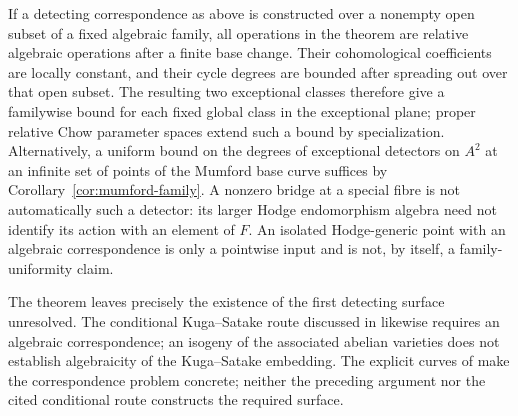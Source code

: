 If a detecting correspondence as above is constructed over a nonempty
open subset of a fixed algebraic family, all operations in the theorem
are relative algebraic operations after a finite base change.  Their
cohomological coefficients are locally constant, and their cycle
degrees are bounded after spreading out over that open subset.
The resulting two exceptional classes therefore give a familywise
bound for each fixed global class in the exceptional plane; proper
relative Chow parameter spaces extend such a bound by specialization.
Alternatively, a uniform bound on the degrees of exceptional detectors on $A^2$ at an infinite set of points of the Mumford base curve suffices by Corollary~\ref{cor:mumford-family}. A nonzero bridge at a special fibre is not automatically such a detector: its larger Hodge endomorphism algebra need not identify its action with an element of $F$.
An isolated Hodge-generic point with an algebraic correspondence is
only a pointwise input and is not, by itself, a family-uniformity claim.

The theorem leaves precisely the existence of the first detecting
surface unresolved.  The conditional Kuga--Satake route discussed in \cite[Section~5.2, pp.~24--25]{BHPS} likewise requires an algebraic correspondence; an isogeny of the associated abelian varieties does not establish algebraicity of the Kuga--Satake embedding.  The explicit curves
of \cite{BHPS} make the correspondence problem concrete; neither
the preceding argument nor the cited conditional route constructs the
required surface.
